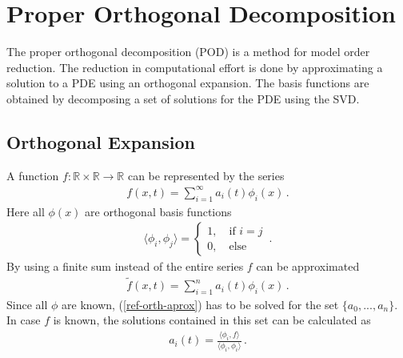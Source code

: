 \section{Proper Orthogonal Decomposition} \label{chap-pod}
The proper orthogonal decomposition (POD) is a method for model order reduction.
The reduction in computational effort is done by approximating a solution to a PDE using an orthogonal expansion.
The basis functions are obtained by decomposing a set of solutions for the PDE using the SVD.
\subsection{Orthogonal Expansion}
A function \(f: \mathbb{R} \times \mathbb{R} \rightarrow \mathbb{R}\) can be represented by the series
\begin{gather}
f(x, t) = \sum_{i = 1}^{\infty}a_i(t)\phi_i(x) \label{ref-orth-exp} \,.
\end{gather}
Here all \(\phi(x)\) are orthogonal basis functions
\begin{gather}
\langle\phi_i, \phi_j\rangle =\begin{cases}
1, \quad \text{if } i = j \\
0, \quad \text{else}
\end{cases} \,. \label{phi-orth}
\end{gather}
By using a finite sum instead of the entire  series \(f\) can be approximated
\begin{gather}
\tilde{f}(x, t) = \sum_{i = 1}^{n}a_{i}(t)\phi_{i}(x) \,. \label{ref-orth-aprox}
\end{gather}
Since all \(\phi\) are known, (\ref{ref-orth-aprox}) has to be solved for the set \(\{a_0, ..., a_n\}\).
In case \(f\) is known, the solutions contained in this set can be calculated as
\begin{gather}
a_i(t) = \frac{\langle \phi_i, f \rangle}{\langle \phi_i, \phi_i \rangle} \,. \label{sol-ai}
\end{gather}
\cite{Gustafsson2011e}
